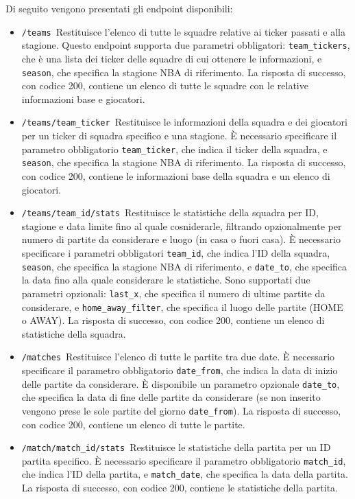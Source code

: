 Di seguito vengono presentati gli endpoint disponibili:
\begin{itemize}
    \item \texttt{/teams}\
    Restituisce l'elenco di tutte le squadre relative ai ticker passati e alla stagione. Questo endpoint supporta due parametri obbligatori: \texttt{team\_tickers}, che è una lista dei ticker delle squadre di cui ottenere le informazioni, e \texttt{season}, che specifica la stagione NBA di riferimento. La risposta di successo, con codice 200, contiene un elenco di tutte le squadre con le relative informazioni base e giocatori.
    \item \texttt{/teams/{team\_ticker}}\
    Restituisce le informazioni della squadra e dei giocatori per un ticker di squadra specifico e una stagione. È necessario specificare il parametro obbligatorio \texttt{team\_ticker}, che indica il ticker della squadra, e \texttt{season}, che specifica la stagione NBA di riferimento. La risposta di successo, con codice 200, contiene le informazioni base della squadra e un elenco di giocatori.
    \item \texttt{/teams/{team\_id}/stats}\
    Restituisce le statistiche della squadra per ID, stagione e data limite fino al quale cosniderarle, filtrando opzionalmente per numero di partite da considerare e luogo (in casa o fuori casa). È necessario specificare i parametri obbligatori \texttt{team\_id}, che indica l'ID della squadra, \texttt{season}, che specifica la stagione NBA di riferimento, e \texttt{date\_to}, che specifica la data fino alla quale considerare le statistiche. Sono supportati due parametri opzionali: \texttt{last\_x}, che specifica il numero di ultime partite da considerare, e \texttt{home\_away\_filter}, che specifica il luogo delle partite (HOME o AWAY). La risposta di successo, con codice 200, contiene un elenco di statistiche della squadra.
    \item \texttt{/matches}\
    Restituisce l'elenco di tutte le partite tra due date. È necessario specificare il parametro obbligatorio \texttt{date\_from}, che indica la data di inizio delle partite da considerare. È disponibile un parametro opzionale \texttt{date\_to}, che specifica la data di fine delle partite da considerare (se non inserito vengono prese le sole partite del giorno \texttt{date\_from}). La risposta di successo, con codice 200, contiene un elenco di tutte le partite.
    \item \texttt{/match/{match\_id}/stats}\
    Restituisce le statistiche della partita per un ID partita specifico. È necessario specificare il parametro obbligatorio \texttt{match\_id}, che indica l'ID della partita, e \texttt{match\_date}, che specifica la data della partita. La risposta di successo, con codice 200, contiene le statistiche della partita.

\end{itemize}
